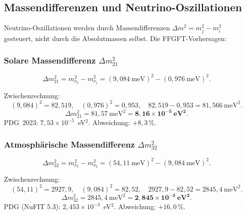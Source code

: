 \subsection{Massendifferenzen und Neutrino-Oszillationen}

Neutrino-Oszillationen werden durch Massendifferenzen
$\Delta m^2 = m_j^2 - m_i^2$ gesteuert, nicht durch
die Absolutmassen selbst. Die FFGFT-Vorhersagen:

\subsubsection{Solare Massendifferenz $\Delta m_{21}^2$}

\begin{equation}
  \Delta m_{21}^2 = m_{\nu_2}^2 - m_{\nu_1}^2
  = (9{,}084~\text{meV})^2 - (0{,}976~\text{meV})^2.
\end{equation}

Zwischenrechnung:
\begin{equation}
  (9{,}084)^2 = 82{,}519,\quad (0{,}976)^2 = 0{,}953,\quad
  82{,}519 - 0{,}953 = 81{,}566~\text{meV}^2.
\end{equation}
\begin{equation}
  \Delta m_{21}^2 = 81{,}57~\text{meV}^2
                 = \mathbf{8{,}16 \times 10^{-5}~\text{eV}^2}.
\end{equation}
PDG~2023: $7{,}53\times10^{-5}$~eV$^2$. Abweichung: $+8{,}3\,\%$.

\subsubsection{Atmosphärische Massendifferenz $\Delta m_{32}^2$}

\begin{equation}
  \Delta m_{32}^2 = m_{\nu_3}^2 - m_{\nu_2}^2
  = (54{,}11~\text{meV})^2 - (9{,}084~\text{meV})^2.
\end{equation}

Zwischenrechnung:
\begin{equation}
  (54{,}11)^2 = 2927{,}9,\quad (9{,}084)^2 = 82{,}52,\quad
  2927{,}9 - 82{,}52 = 2845{,}4~\text{meV}^2.
\end{equation}
\begin{equation}
  \Delta m_{32}^2 = 2845{,}4~\text{meV}^2
                 = \mathbf{2{,}845\times10^{-3}~\text{eV}^2}.
\end{equation}
PDG (NuFIT 5.3): $2{,}453\times10^{-3}$~eV$^2$. Abweichung: $+16{,}0\,\%$.

